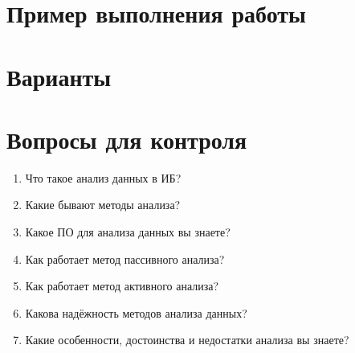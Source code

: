 \section{Пример выполнения работы}\label{sect7_c}
%
\section{Варианты}\label{sect7_d}
%
\section{Вопросы для контроля}\label{sect7_e}
%
\begin{enumerate}
  \item Что такое анализ данных в ИБ?
  \item Какие бывают методы анализа?
  \item Какое ПО для анализа данных вы знаете?
  \item Как работает метод пассивного анализа?
  \item Как работает метод активного анализа?
  \item Какова надёжность методов анализа данных?
  \item Какие особенности, достоинства и недостатки анализа вы знаете?
\end{enumerate}
